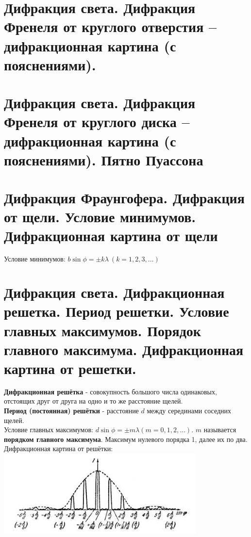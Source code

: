 \documentclass[14pt]{extarticle}
\begin{document}
\section{Дифракция света. Дифракция Френеля от круглого отверстия – дифракционная
картина (с пояснениями).}
\section{Дифракция света. Дифракция Френеля от круглого диска – дифракционная картина (с
пояснениями). Пятно Пуассона}
\section{Дифракция Фраунгофера. Дифракция от щели. Условие минимумов. Дифракционная
картина от щели}
Условие минимумов: $b \sin \phi = \pm k \lambda \ (k = 1, 2, 3, ...)$
\section{Дифракция света. Дифракционная решетка. Период решетки. Условие главных
максимумов. Порядок главного максимума. Дифракционная картина от решетки.}
\textbf{Дифракционная решётка} - совокупность большого числа одинаковых,
отстоящих друг от друга на одно и то же расстояние щелей.\\
\textbf{Период (постоянная) решётки} - расстояние $d$ между серединами соседних
щелей.\\
Условие главных максимумов: $d \sin \phi = \pm m \lambda 
(m = 0, 1, 2, ...)$. $m$ называется \textbf{порядком главного максимума}.
Максимум нулевого порядка 1, далее их по два.\\
Дифракционная картина от решётки:
\includegraphics{difraction_pattern.png}
\end{document}
